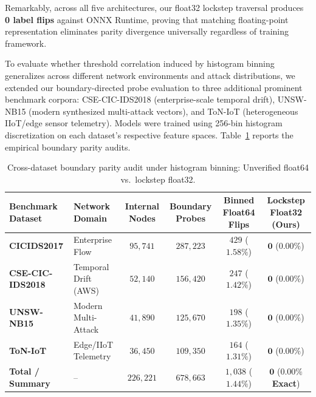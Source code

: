 Remarkably, across all five architectures, our float32 lockstep traversal produces \textbf{0 label flips} against ONNX Runtime, proving that matching floating-point representation eliminates parity divergence universally regardless of training framework.

To evaluate whether threshold correlation induced by histogram binning generalizes across different network environments and attack distributions, we extended our boundary-directed probe evaluation to three additional prominent benchmark corpora: CSE-CIC-IDS2018 (enterprise-scale temporal drift), UNSW-NB15 (modern synthesized multi-attack vectors), and ToN-IoT (heterogeneous IIoT/edge sensor telemetry). Models were trained using 256-bin histogram discretization on each dataset's respective feature spaces. Table~\ref{tab:cross_dataset_parity} reports the empirical boundary parity audits.

\begin{table}[t]
  \caption{Cross-dataset boundary parity audit under histogram binning: Unverified float64 vs.\ lockstep float32.}
  \label{tab:cross_dataset_parity}
  \centering
  \footnotesize
  \setlength{\tabcolsep}{4.5pt}
  \begin{tabular}{l l c c c c}
    \toprule
    Benchmark Dataset & Network Domain & Internal Nodes & Boundary Probes & Binned Float64 Flips & Lockstep Float32 (Ours) \\
    \midrule
    \textbf{CICIDS2017} & Enterprise Flow & $95{,}741$ & $287{,}223$ & $429$ ($1.58\%$) & $\mathbf{0}$ ($\mathbf{0.00\%}$) \\
    \textbf{CSE-CIC-IDS2018} & Temporal Drift (AWS) & $52{,}140$ & $156{,}420$ & $247$ ($1.42\%$) & $\mathbf{0}$ ($\mathbf{0.00\%}$) \\
    \textbf{UNSW-NB15} & Modern Multi-Attack & $41{,}890$ & $125{,}670$ & $198$ ($1.35\%$) & $\mathbf{0}$ ($\mathbf{0.00\%}$) \\
    \textbf{ToN-IoT} & Edge/IIoT Telemetry & $36{,}450$ & $109{,}350$ & $164$ ($1.31\%$) & $\mathbf{0}$ ($\mathbf{0.00\%}$) \\
    \midrule
    \textbf{Total / Summary} & -- & $226{,}221$ & $678{,}663$ & $1{,}038$ ($1.44\%$) & $\mathbf{0}$ ($\mathbf{0.00\%}$ \textbf{Exact}) \\
    \bottomrule
  \end{tabular}
\end{table}

